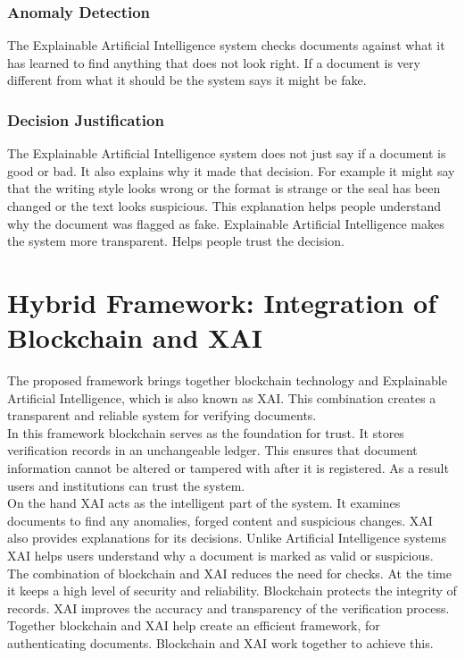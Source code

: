        \subsubsection{Anomaly Detection}
            The Explainable Artificial Intelligence system checks documents against what it has learned to find anything that does not look right. If a document is very different from what it should be the system says it might be fake.
        \subsubsection{Decision Justification}
            The Explainable Artificial Intelligence system does not just say if a document is good or bad. It also explains why it made that decision. For example it might say that the writing style looks wrong or the format is strange or the seal has been changed or the text looks suspicious. This explanation helps people understand why the document was flagged as fake. Explainable Artificial Intelligence makes the system more transparent. Helps people trust the decision.


\section{Hybrid Framework: Integration of Blockchain and XAI}
    The proposed framework brings together blockchain technology and Explainable Artificial Intelligence, which is also known as XAI. This combination creates a transparent and reliable system for verifying documents.
    \\
    In this framework blockchain serves as the foundation for trust. It stores verification records in an unchangeable ledger. This ensures that document information cannot be altered or tampered with after it is registered. As a result users and institutions can trust the system.
    \\
    On the hand XAI acts as the intelligent part of the system. It examines documents to find any anomalies, forged content and suspicious changes. XAI also provides explanations for its decisions. Unlike Artificial Intelligence systems XAI helps users understand why a document is marked as valid or suspicious.
    \\
    The combination of blockchain and XAI reduces the need for checks. At the time it keeps a high level of security and reliability. Blockchain protects the integrity of records. XAI improves the accuracy and transparency of the verification process. Together blockchain and XAI help create an efficient framework, for authenticating documents. Blockchain and XAI work together to achieve this.


